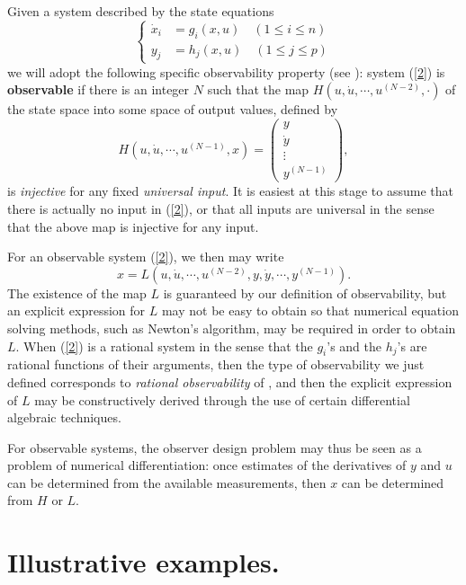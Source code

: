 Given a system described by the state equations
\begin{equation}
\left\{
\begin{array}{rcl}
\dot x_i & = g_i(x, u) \quad (1 \le i \le n)\\
y_j & = h_j(x, u) \quad (1 \le j \le p)\end{array}
\right.
\label{2}
\end{equation}
we will adopt the following specific observability property (see
\cite{grizzle1990b,moraal1992}):
system (\ref{2}) is {\bf observable} if there is an integer $N$ such
that the map $H\left(u, \dot u, \cdots, u^{(N-2)}, \cdot \right)$ of
the state space into some space of output values, defined by
\begin{equation}
H\left(u, \dot u, \cdots, u^{(N-1)}, x \right) = 
\left( 
\begin{array}{c} y \\ \dot
y \\ \vdots \\ y^{(N-1)} \end{array}\right), \label{3}
\end{equation}
is {\it injective} for any fixed {\it universal input}.
It is easiest at this stage to assume that there is actually
no input in (\ref{2}), or that all inputs are universal in the sense that
the above map is injective for any input. 

For an observable system (\ref{2}), we then may write
$$x = L\left(u, \dot u, \cdots, u^{(N-2)}, y, \dot y, \cdots, y^{(N-1)} 
\right).$$
The existence of the map $L$ is guaranteed by our definition of 
observability, but an explicit expression for $L$ may not be easy to 
obtain so that numerical equation solving methods, such as Newton's algorithm,
may be required in order to obtain $L$.  
When (\ref{2}) is a rational system in the sense that the $g_i$'s and the 
$h_j$'s are rational functions of their arguments, then the type of 
observability we just defined corresponds to {\it rational 
observability} of \cite{diop1991d,diop1992b}, and then the explicit
expression of $L$ may be  constructively derived through the use of certain
differential
algebraic techniques.

For observable systems, the observer design problem may thus be 
seen as a problem of numerical differentiation: once estimates of the
derivatives
of $y$ and $u$ can be determined from the available measurements, then $x$ can be
determined from $H$ or $L$.


\section{Illustrative examples.}\setcounter{equation}{0}
\label{examples}

